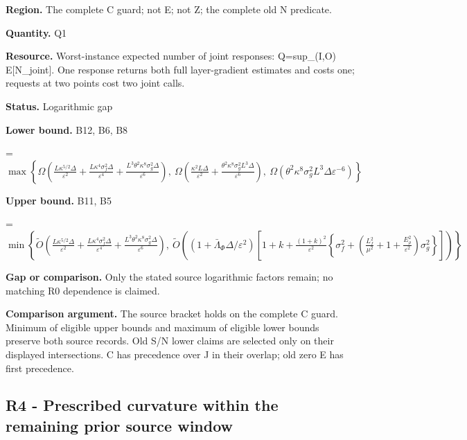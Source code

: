 \documentclass[10pt,a4paper]{article}
\newcommand{\AtlasMath}[1]{\par\begingroup\centering\setbox0=\hbox{$\displaystyle #1$}\ifdim\wd0>1.4\linewidth\typeout{ATLAS WIDE FORMULA: \the\wd0}\fi\ifdim\wd0>\linewidth\resizebox{\linewidth}{!}{\box0}\else\box0\fi\par\endgroup}
\begin{document}
\textbf{Region.} The complete C guard; not E; not Z; the complete old N predicate.



\textbf{Quantity.} Q1



\textbf{Resource.} Worst-instance expected number of joint responses: Q=sup\_(I,O) E[N\_joint]. One response returns both full layer-gradient estimates and costs one; requests at two points cost two joint calls.



\textbf{Status.} Logarithmic gap



\textbf{Lower bound.} B12, B6, B8



\AtlasMath{\max\left\{\Omega\!\left(\frac{L\kappa^{5/2}\Delta}{\varepsilon^2}+\frac{L\kappa^4\sigma_f^2\Delta}{\varepsilon^4}+\frac{L^3\theta^2\kappa^8\sigma_g^2\Delta}{\varepsilon^6}\right),\ \Omega\!\left(\frac{\kappa^2L\Delta}{\varepsilon^2}+\frac{\theta^2\kappa^8\sigma_g^2L^3\Delta}{\varepsilon^6}\right),\ \Omega(\theta^2\kappa^8\sigma_g^2L^3\Delta\varepsilon^{-6})\right\}}


\textbf{Upper bound.} B11, B5



\AtlasMath{\min\left\{\widetilde O\!\left(\frac{L\kappa^{5/2}\Delta}{\varepsilon^2}+\frac{L\kappa^4\sigma_f^2\Delta}{\varepsilon^4}+\frac{L^3\theta^2\kappa^8\sigma_g^2\Delta}{\varepsilon^6}\right),\ \widetilde O\!\left((1+\bar\Lambda_\Phi\Delta/\varepsilon^2)\left[1+k+\frac{(1+k)^2}{\varepsilon^2}\left\{\sigma_f^2+\left(\frac{L_f^2}{\mu^2}+1+\frac{E_\rho^2}{\varepsilon^2}\right)\sigma_g^2\right\}\right]\right)\right\}}


\textbf{Gap or comparison.} Only the stated source logarithmic factors remain; no matching R0 dependence is claimed.



\textbf{Comparison argument.} The source bracket holds on the complete C guard. Minimum of eligible upper bounds and maximum of eligible lower bounds preserve both source records. Old S/N lower claims are selected only on their displayed intersections. C has precedence over J in their overlap; old zero E has first precedence.



\subsection{R4 - Prescribed curvature within the remaining prior source window}
\end{document}
